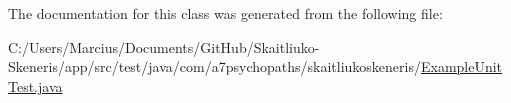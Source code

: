 The documentation for this class was generated from the following file\+:\begin{DoxyCompactItemize}
\item 
C\+:/\+Users/\+Marcius/\+Documents/\+Git\+Hub/\+Skaitliuko-\/\+Skeneris/app/src/test/java/com/a7psychopaths/skaitliukoskeneris/\mbox{\hyperlink{_example_unit_test_8java}{Example\+Unit\+Test.\+java}}\end{DoxyCompactItemize}
